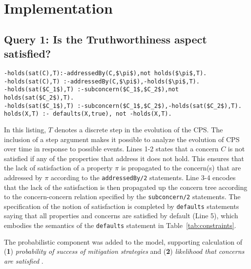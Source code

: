 \section{Implementation}
%
\subsection{Query 1: Is the Truthworthiness aspect satisfied?}
%
\begin{lstlisting}[language=clingo,caption=Reasoning for the satsifaction of aspect, label=lst:q_1_reasoning_satisfaction, mathescape=true,xleftmargin=.01\textwidth, breaklines=true]
-holds(sat(C),T):-addressedBy(C,$\pi$),not holds($\pi$,T).
-holds(sat(C),T) :-addressedBy(C,$\pi$),-holds($\pi$,T).
-holds(sat($C_1$),T) :-subconcern($C_1$,$C_2$),not holds(sat($C_2$),T).
-holds(sat($C_1$),T) :-subconcern($C_1$,$C_2$),-holds(sat($C_2$),T).
holds(X,T) :- defaults(X,true), not -holds(X,T).
\end{lstlisting}
In this listing, $T$ denotes a discrete step in the evolution of the CPS. The inclusion of a step argument makes it possible to analyze the evolution of CPS over time in response to possible events. Lines 1-2 states that a concern $C$ is not satisfied if any of the properties that address it does not hold. This ensures that the lack of satisfaction of a property $\pi$ is propagated to the concern(s) that are addressed by $\pi$ according to the {\tt addressedBy/2} statements. Line 3-4 encodes that the lack of the satisfaction is then propagated up the concern tree according to the concern-concern relation specified by the {\tt subconcern/2} statements. The specification of the notion of satisfaction is completed by {\tt defaults} statements saying that all properties and concerns are satisfied by default (Line 5), which embodies the semantics of the {\tt defaults} statement in Table~\ref{tab:constraints}.
%

The probabilistic component was added to the model, supporting calculation of ({\bf 1}) \emph{probability of success of mitigation strategies} and ({\bf 2}) \emph{likelihood that concerns are satisfied} .

